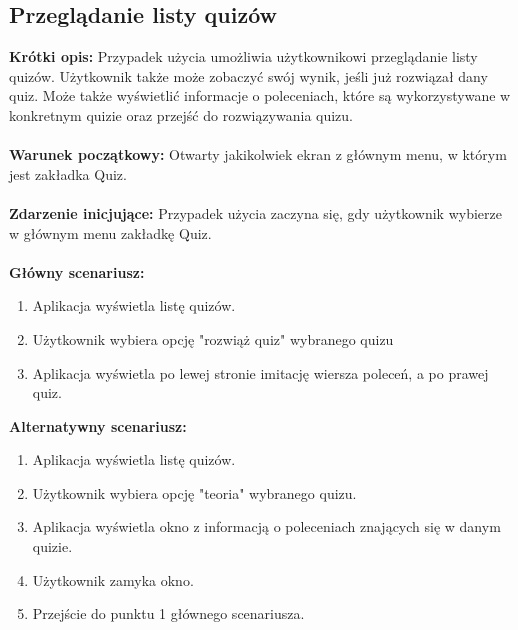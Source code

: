 \documentclass[10pt,a4paper]{report}
\begin{document}
\begin{adjustwidth}{2cm}{2cm}
\subsection{Przeglądanie listy quizów}
\begin{minipage}{1\linewidth}
\textbf{Krótki opis:} Przypadek użycia umożliwia użytkownikowi przeglądanie listy quizów. Użytkownik także może zobaczyć swój wynik, jeśli już rozwiązał dany quiz. Może także wyświetlić informacje o poleceniach, które są wykorzystywane w konkretnym quizie oraz przejść do rozwiązywania quizu.  \\ \\
\textbf{Warunek początkowy:} Otwarty jakikolwiek ekran z głównym menu, w którym jest zakładka Quiz. \\ \\
\textbf{Zdarzenie inicjujące:} Przypadek użycia zaczyna się, gdy użytkownik wybierze w głównym menu zakładkę Quiz. \\ \\
\textbf{Główny scenariusz:} 
\begin{enumerate}
\setlength\itemsep{0.2cm}
    \item Aplikacja wyświetla listę quizów.
    \item Użytkownik wybiera opcję "rozwiąż quiz" wybranego quizu
    \item Aplikacja wyświetla po lewej stronie imitację wiersza poleceń, a po prawej quiz. \\
\end{enumerate}
\end{minipage}
\textbf{Alternatywny scenariusz:} 
\begin{enumerate}
\setlength\itemsep{0.2cm}
    \item Aplikacja wyświetla listę quizów.
    \item Użytkownik wybiera opcję "teoria" wybranego quizu.
    \item Aplikacja wyświetla okno z informacją o poleceniach znających się w danym quizie.
    \item Użytkownik zamyka okno.
    \item Przejście do punktu 1 głównego scenariusza.
\end{enumerate}

\end{adjustwidth}
\end{document}
